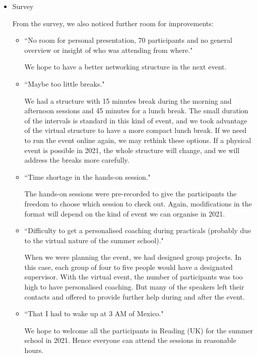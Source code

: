 \begin{itemize}
\item Survey

From the survey, we also noticed further room for improvements:

\begin{itemize}

\item ``No room for personal presentation, 70 participants and no general overview or insight of
who was attending from where."

We hope to have a better networking structure in the next event.

\item ``Maybe too little breaks."

We had a structure with 15 minutes break during the morning and afternoon sessions and 45 minutes for a lunch break. The small duration of the intervals is standard in this kind of event, and we took advantage of the virtual structure to have a more compact lunch break. If we need to run the event online again, we may rethink these options. If a physical event is possible in 2021, the whole structure will change, and we will address the breaks more carefully.

\item ``Time shortage in the hands-on session."

The hands-on sessions were pre-recorded to give the participants the freedom to choose which session to check out. Again, modifications in the format will depend on the kind of event we can organise in 2021.

\item ``Difficulty to get a personalised coaching during practicals (probably due to the virtual
nature of the summer school)."

When we were planning the event, we had designed group projects. In this case, each group of four to five people would have a designated supervisor. With the virtual event, the number of participants was too high to have personalised coaching. But many of the speakers left their contacts and offered to provide further help during and after the event.

\item ``That I had to wake up at 3 AM of Mexico."

We hope to welcome all the participants in Reading (UK) for the summer school in 2021. Hence everyone can attend the sessions in reasonable hours.

\end{itemize}

\end{itemize}
